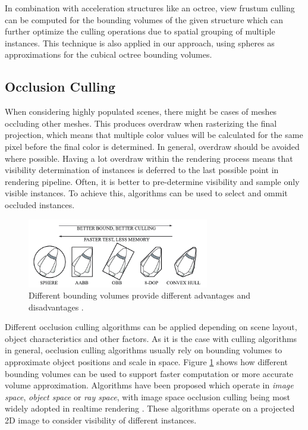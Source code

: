\noindent
In combination with acceleration structures like an octree, view frustum culling can be computed for the bounding 
volumes of the given structure which can further optimize the culling operations due to spatial grouping of multiple 
instances. This technique is also applied in our approach, using spheres as approximations for the cubical octree 
bounding volumes.

\subsection{Occlusion Culling} \label{subsec-point-based-occlusion-culling}

When considering highly populated scenes, there might be cases of meshes occluding other meshes. This produces overdraw 
when rasterizing the final projection, which means that multiple color values will be calculated for the same pixel 
before the final color is determined. In general, overdraw should be avoided where possible. Having a lot overdraw 
within the rendering process means that visibility determination of instances is deferred to the last possible point in 
rendering pipeline. Often, it is better to pre-determine visibility and sample only visible instances. To achieve this, 
algorithms can be used to select and ommit occluded instances. \\

\begin{figure}[h]
    \centering
    \includegraphics[width=300px]{images/graphics/bounding-volume-quality.png}
    \caption{Different bounding volumes provide different advantages and disadvantages \cite{Six2021}.}
    \label{fig:bounding-volumes}
\end{figure}

\noindent
Different occlusion culling algorithms can be applied depending on scene layout, object characteristics and other factors.
As it is the case with culling algorithms in general, occlusion culling algorithms usually rely on bounding volumes to 
approximate object positions and scale in space. Figure \ref{fig:bounding-volumes} shows how different bounding volumes 
can be used to support faster computation or more accurate volume approximation. Algorithms have been proposed which 
operate in \emph{image space}, \emph{object space} or \emph{ray space}, with image space occlusion culling being most 
widely adopted in realtime rendering \cite{AkenineMoeller2018}. These algorithms operate on a projected 2D image to 
consider visibility of different instances.  

